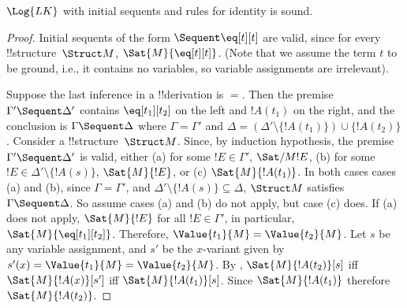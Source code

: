 \documentclass[../../../include/open-logic-section]{subfiles}
\begin{document}
\begin{prop}
$\Log{LK}$ with initial sequents and rules for identity is sound.
\end{prop}

\begin{proof}
Initial sequents of the form ${} \Sequent \eq[t][t]$ are valid, since
for every !!{structure}~$\Struct M$, $\Sat{M}{\eq[t][t]}$. (Note that
we assume the term $t$ to be ground, i.e., it contains no variables,
so variable assignments are irrelevant).

Suppose the last inference in a !!{derivation} is $=$. Then the
premise $\Gamma' \Sequent \Delta'$ contains $\eq[t_1][t_2]$ on the left
and $!A(t_1)$ on the right, and the conclusion is $\Gamma \Sequent
\Delta$ where $\Gamma = \Gamma'$ and $\Delta = (\Delta' \setminus
\{!A(t_1)\}) \cup \{!A(t_2)\}$. Consider a !!{structure}~$\Struct
M$. Since, by induction hypothesis, the premise $\Gamma' \Sequent
\Delta'$ is valid, either (a) for some $!E \in \Gamma'$,
$\Sat/{M}{!E}$, (b) for some $!E \in \Delta' \setminus \{!A(s)\}$,
$\Sat{M}{!E}$, or (c) $\Sat{M}{!A(t_1)}$. In both cases cases (a) and
(b), since $\Gamma = \Gamma'$, and $\Delta' \setminus \{!A(s)\}
\subseteq \Delta$, $\Struct M$ satisfies $\Gamma \Sequent \Delta$. So
assume cases (a) and (b) do not apply, but case (c) does. If (a) does
not apply, $\Sat{M}{!E}$ for all $!E \in \Gamma'$, in particular,
$\Sat{M}{\eq[t_1][t_2]}$. Therefore, $\Value{t_1}{M} = \Value{t_2}{M}$. Let
$s$ be any variable assignment, and $s'$ be the $x$-variant given by
$s'(x) = \Value{t_1}{M} = \Value{t_2}{M}$. By
, $\Sat{M}{!A(t_2)}[s]$ iff
$\Sat{M}{!A(x)}[s']$ iff $\Sat{M}{!A(t_1)}[s]$. Since $\Sat{M}{!A(t_1)}$
therefore $\Sat{M}{!A(t_2)}$.
\end{proof}
\end{document}
